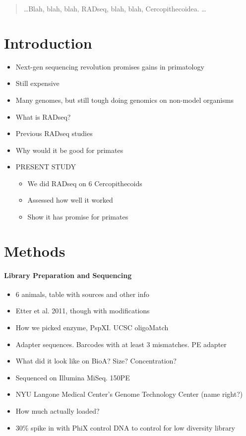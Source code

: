 \documentclass[12pt]{article}
\begin{document}
\maketitle

\begin{abstract}
\ldots Blah, blah, blah, RADseq, blah, blah, Cercopithecoidea. \ldots
\end{abstract}

\section{Introduction}
\begin{itemize}
	\item Next-gen sequencing revolution promises gains in primatology
	\item Still expensive
	\item Many genomes, but still tough doing genomics on non-model organisms
	\item What is RADseq?
	\item Previous RADseq studies
	\item Why would it be good for primates
	\item PRESENT STUDY
	\begin{itemize}
		\item We did RADseq on 6 Cercopithecoids
		\item Assessed how well it worked
		\item Show it has promise for primates
	\end{itemize}
\end{itemize}

\section{Methods}

\paragraph{Library Preparation and Sequencing}
\begin{itemize}
	\item 6 animals, table with sources and other info
	\item Etter et al. 2011, though with modifications
	\item How we picked enzyme, PspXI. UCSC oligoMatch
	\item Adapter sequences. Barcodes with at least 3 mismatches. PE adapter
	\item What did it look like on BioA? Size? Concentration?
	\item Sequenced on Illumina MiSeq. 150PE
	\item NYU Langone Medical Center's Genome Technology Center (name right?)
	\item How much actually loaded?
	\item 30\% spike in with PhiX control DNA to control for low diversity library
\end{itemize}
\end{document}
